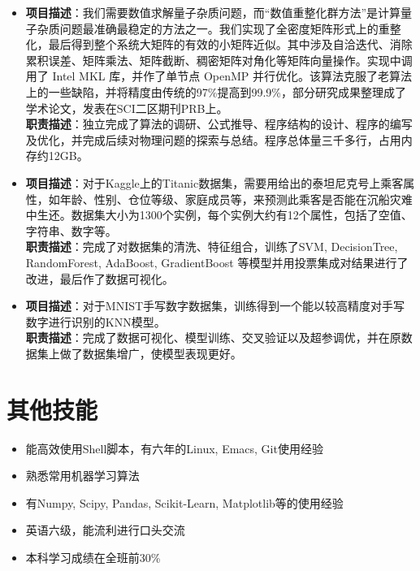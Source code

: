 \documentclass{resume}
\begin{document}
\begin{itemize}
\item {}
{\textbf{项目描述}：我们需要数值求解量子杂质问题，而“数值重整化群方法”是计算量子杂质问题最准确最稳定的方法之一。我们实现了全密度矩阵形式上的重整化，最后得到整个系统大矩阵的有效的小矩阵近似。其中涉及自洽迭代、消除累积误差、矩阵乘法、矩阵截断、稠密矩阵对⻆化等矩阵向量操作。实现中调用了 Intel MKL 库，并作了单节点 OpenMP 并行优化。该算法克服了老算法上的一些缺陷，并将精度由传统的97\%提高到99.9\%，部分研究成果整理成了学术论文，发表在SCI二区期刊PRB上。}\\
\textbf{职责描述}：独立完成了算法的调研、公式推导、程序结构的设计、程序的编写及优化，并完成后续对物理问题的探索与总结。程序总体量三千多行，占用内存约12GB。
\item {}
\textbf{项目描述}：对于Kaggle上的Titanic数据集，需要用给出的泰坦尼克号上乘客属性，如年龄、性别、仓位等级、家庭成员等，来预测此乘客是否能在沉船灾难中生还。数据集大小为1300个实例，每个实例大约有12个属性，包括了空值、字符串、数字等。\\
\textbf{职责描述}：完成了对数据集的清洗、特征组合，训练了SVM, DecisionTree, RandomForest, AdaBoost, GradientBoost 等模型并用投票集成对结果进行了改进，最后作了数据可视化。
\item {}
\textbf{项目描述}：对于MNIST手写数字数据集，训练得到一个能以较高精度对手写数字进行识别的KNN模型。\\
\textbf{职责描述}：完成了数据可视化、模型训练、交叉验证以及超参调优，并在原数据集上做了数据集增广，使模型表现更好。
\end{itemize}

\section{其他技能}
\begin{itemize}%
\item 能高效使用Shell脚本，有六年的Linux, Emacs, Git使用经验
\item 熟悉常用机器学习算法
\item 有Numpy, Scipy, Pandas, Scikit-Learn, Matplotlib等的使用经验
\item 英语六级，能流利进行口头交流
\item 本科学习成绩在全班前30\%
\end{itemize}
\end{document}
